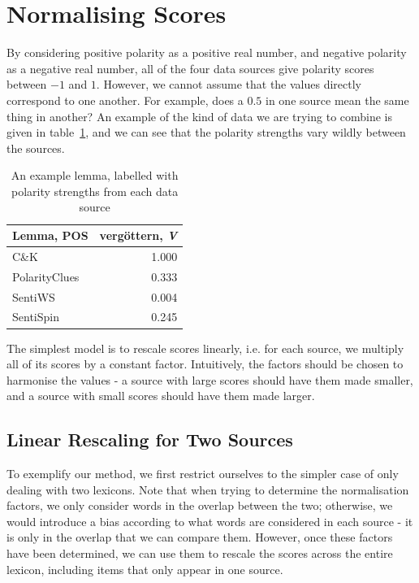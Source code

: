 \documentclass[11pt]{article}
\begin{document}
\section{Normalising Scores\label{sec:norm}}

By considering positive polarity as a positive real number, and negative
polarity as a negative real number, all of the four data sources give
polarity scores between $-1$ and $1$. However, we cannot assume
that the values directly correspond to one another. For example, does
a $0.5$ in one source mean the same thing in another?  An example of the kind of data we are trying to combine is given in table~\ref{tab:lemma}, and we can see that the polarity strengths vary wildly between the sources.

\begin{table}[t]
\centering
    \begin{tabular}{|l|r|} \hline
	Lemma, POS        & vergöttern, \emph{V} \\ \hline
	C\&K	& 1.000 \\
	PolarityClues	& 0.333 \\
	SentiWS	& 0.004 \\
	SentiSpin	& 0.245 \\ \hline
    \end{tabular}
\caption{An example lemma, labelled with polarity strengths from each data source}
\label{tab:lemma}
\end{table}

The simplest model is to rescale scores linearly, i.e. for each
source, we multiply all of its scores by a constant factor. Intuitively,
the factors should be chosen to harmonise the values - a source with
large scores should have them made smaller, and a source with small
scores should have them made larger.


\subsection{Linear Rescaling for Two Sources}

To exemplify our method, we first restrict ourselves to the simpler
case of only dealing with two lexicons. Note that when trying to determine
the normalisation factors, we only consider words in the overlap between
the two; otherwise, we would introduce a bias according to what words
are considered in each source - it is only in the overlap that we
can compare them. However, once these factors have been determined,
we can use them to rescale the scores across the entire lexicon, including
items that only appear in one source.
\end{document}
